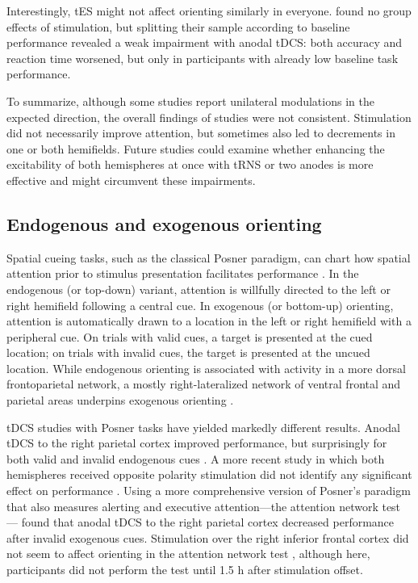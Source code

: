 \documentclass[11pt,english,]{memoir}
\begin{document}
Interestingly, tES might not affect orienting similarly in everyone. \textcite{Learmonth2015} found no group effects of stimulation, but splitting their sample according to baseline performance revealed a weak impairment with anodal tDCS: both accuracy and reaction time worsened, but only in participants with already low baseline task performance.

To summarize, although some studies report unilateral modulations in the expected direction, the overall findings of studies were not consistent. Stimulation did not necessarily improve attention, but sometimes also led to decrements in one or both hemifields. Future studies could examine whether enhancing the excitability of both hemispheres at once with tRNS or two anodes is more effective and might circumvent these impairments.

\hypertarget{endogenous-and-exogenous-orienting}{%
\subsection{Endogenous and exogenous orienting}\label{endogenous-and-exogenous-orienting}}

Spatial cueing tasks, such as the classical Posner paradigm, can chart how spatial attention prior to stimulus presentation facilitates performance \autocites{Chica2014}{Posner1980b}. In the endogenous (or top-down) variant, attention is willfully directed to the left or right hemifield following a central cue. In exogenous (or bottom-up) orienting, attention is automatically drawn to a location in the left or right hemifield with a peripheral cue. On trials with valid cues, a target is presented at the cued location; on trials with invalid cues, the target is presented at the uncued location. While endogenous orienting is associated with activity in a more dorsal frontoparietal network, a mostly right-lateralized network of ventral frontal and parietal areas underpins exogenous orienting \autocite{Corbetta2002}.

tDCS studies with Posner tasks have yielded markedly different results. Anodal tDCS to the right parietal cortex improved performance, but surprisingly for both valid and invalid endogenous cues \autocite{Bolognini2010}. A more recent study in which both hemispheres received opposite polarity stimulation did not identify any significant effect on performance \autocite{Li2015a}. Using a more comprehensive version of Posner's paradigm that also measures alerting and executive attention---the attention network test \autocite{Fan2002}---\textcite{Roy2015} found that anodal tDCS to the right parietal cortex decreased performance after invalid exogenous cues. Stimulation over the right inferior frontal cortex did not seem to affect orienting in the attention network test \autocite{Coffman2012}, although here, participants did not perform the test until 1.5 h after stimulation offset.
\end{document}
